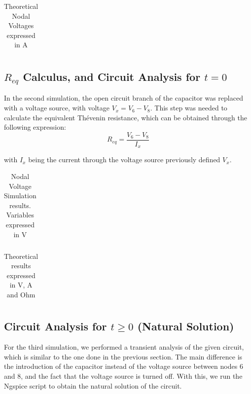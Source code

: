 \begin{table}[h]
\centering
\begin{tabularx}{0.6\textwidth} {
  | >{\raggedright\arraybackslash}X
  | >{\raggedleft\arraybackslash}X | }
 \hline

\end{tabularx}
\caption{Theoretical Nodal Voltages expressed in A}
\end{table}

\subsection{$R_{eq}$ Calculus, and Circuit Analysis for $t=0$}

In the second simulation, the open circuit branch of the capacitor was replaced with a voltage source, with voltage $V_x=V_6-V_8$. This step was needed to calculate the equivalent Thévenin resistance, which can be obtained through the following expression:
\begin{equation}
     R_{eq}=\frac{V_6-V_8}{I_x}
\end{equation}


with $I_x$ being the current through the voltage source previously defined $V_x$.

\begin{table}[h]
\centering
\begin{tabularx}{0.6\textwidth} {
  | >{\raggedright\arraybackslash}X
  | >{\raggedleft\arraybackslash}X | }
 \hline

\end{tabularx}
\caption{Nodal Voltage Simulation results. Variables expressed in V}
\end{table}

\begin{table}[h]
\centering
\begin{tabularx}{0.6\textwidth} {
  | >{\raggedright\arraybackslash}X
  | >{\raggedleft\arraybackslash}X | }
 \hline

\end{tabularx}
\caption{Theoretical results expressed in V, A and Ohm}
\end{table}

\subsection{Circuit Analysis for $t \geq 0 $ (Natural Solution)}

For the third simulation, we performed a transient analysis of the given circuit, which is similar to the one done in the previous section. The main difference is the introduction of the capacitor instead of the voltage source between nodes 6 and 8, and the fact that the voltage source is turned off. With this, we run the Ngspice script to obtain the natural solution of the circuit.

